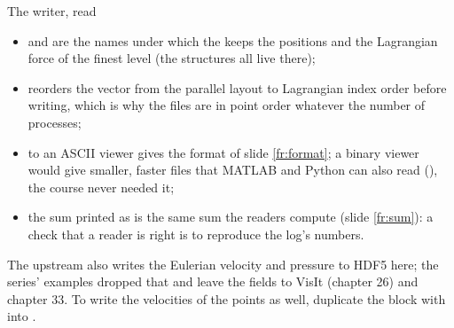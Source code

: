 \documentclass[aspectratio=169,11pt]{beamer}
\begin{document}
\begin{frame}{The writer, read}
\label{fr:writer2}
\small
\begin{itemize}
  \item {} and  are the names under which the  keeps the positions and the Lagrangian force of the finest level (the structures all live there);
  \item {} reorders the vector from the parallel layout to Lagrangian index order before writing, which is why the files are in point order whatever the number of processes;
  \item {} to an ASCII viewer gives the format of slide \ref{fr:format}; a binary viewer would give smaller, faster files that MATLAB and Python can also read (), the course never needed it;
  \item the sum printed as  is the same sum the readers compute (slide \ref{fr:sum}): a check that a reader is right is to reproduce the log's numbers.
\end{itemize}
\vspace{1mm}
\footnotesize The upstream  also writes the Eulerian velocity and pressure to HDF5 here; the series' examples dropped that and leave the fields to VisIt (chapter 26) and chapter 33. To write the velocities of the points as well, duplicate the  block with  into .
\end{frame}
\end{document}
